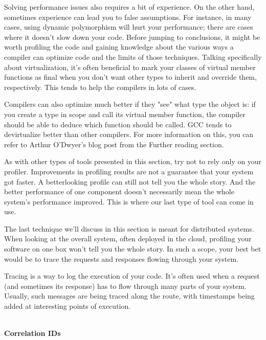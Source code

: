 Solving performance issues also requires a bit of experience. On the other hand, sometimes experience can lead you to false assumptions. For instance, in many cases, using dynamic polymorphism will hurt your performance; there are cases where it doesn't slow down your code. Before jumping to conclusions, it might be worth profiling the code and gaining knowledge about the various ways a compiler can optimize code and the limits of those techniques. Talking specifically about virtualization, it's often beneficial to mark your classes of virtual member functions as final when you don't want other types to inherit and override them, respectively. This tends to help the compilers in lots of cases.

Compilers can also optimize much better if they "see" what type the object is: if you create a type in scope and call its virtual member function, the compiler should be able to deduce which function should be called. GCC tends to devirtualize better than other compilers. For more information on this, you can refer to Arthur O'Dwyer's blog post from the Further reading section.

As with other types of tools presented in this section, try not to rely only on your profiler. Improvements in profiling results are not a guarantee that your system got faster. A betterlooking profile can still not tell you the whole story. And the better performance of one component doesn't necessarily mean the whole system's performance improved. This is where our last type of tool can come in use.


The last technique we'll discuss in this section is meant for distributed systems. When looking at the overall system, often deployed in the cloud, profiling your software on one  box won't tell you the whole story. In such a scope, your best bet would be to trace the requests and responses flowing through your system.

Tracing is a way to log the execution of your code. It's often used when a request (and sometimes its response) has to flow through many parts of your system. Usually, such messages are being traced along the route, with timestamps being added at interesting points of execution.

\hspace*{\fill} \\ %
\noindent
\textbf{Correlation IDs}

